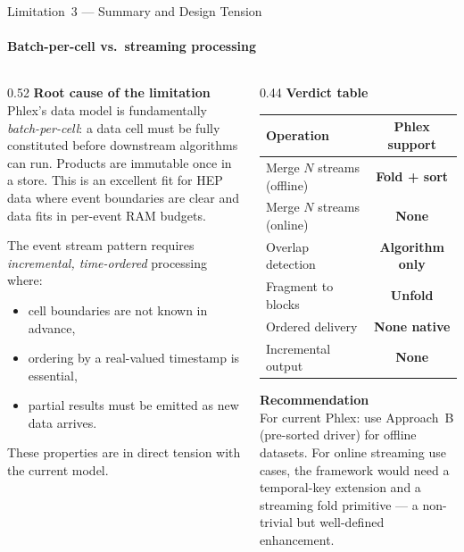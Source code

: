 \documentclass[aspectratio=169,10pt]{beamer}
\newcommand{\good}[1]{\textcolor{green!50!black}{\textbf{#1}}}
\newcommand{\bad}[1]{\textcolor{red!70!black}{\textbf{#1}}}
\newcommand{\warn}[1]{\textcolor{orange!80!black}{\textbf{#1}}}
\begin{document}
\begin{frame}{Limitation~3 --- Summary and Design Tension}
  \framesubtitle{Batch-per-cell vs.\ streaming processing}

  \begin{columns}[T]
    \begin{column}{0.52\textwidth}
      \textbf{Root cause of the limitation} \\[4pt]
      \small
      Phlex's data model is fundamentally \emph{batch-per-cell}: a data
      cell must be fully constituted before downstream algorithms can run.
      Products are immutable once in a store.  This is an excellent fit
      for HEP data where event boundaries are clear and data fits in
      per-event RAM budgets.

      \medskip
      The event stream pattern requires \emph{incremental, time-ordered}
      processing where:
      \begin{itemize}\small
        \item cell boundaries are not known in advance,
        \item ordering by a real-valued timestamp is essential,
        \item partial results must be emitted as new data arrives.
      \end{itemize}
      These properties are in direct tension with the current model.
    \end{column}
    \begin{column}{0.44\textwidth}
      \textbf{Verdict table} \\[4pt]
      \small
      \begin{tabular}{@{}lc@{}}
        \toprule
        Operation & Phlex support \\
        \midrule
        Merge $N$ streams (offline) & \warn{Fold + sort} \\
        Merge $N$ streams (online) & \bad{None} \\
        Overlap detection & \warn{Algorithm only} \\
        Fragment to blocks & \good{Unfold} \\
        Ordered delivery & \bad{None native} \\
        Incremental output & \bad{None} \\
        \bottomrule
      \end{tabular}

      \medskip
      \textbf{Recommendation} \\[4pt]
      \small
      For current Phlex: use Approach~B (pre-sorted driver) for offline
      datasets.  For online streaming use cases, the framework would need
      a temporal-key extension and a streaming fold primitive --- a
      non-trivial but well-defined enhancement.
    \end{column}
  \end{columns}
\end{frame}
\end{document}
